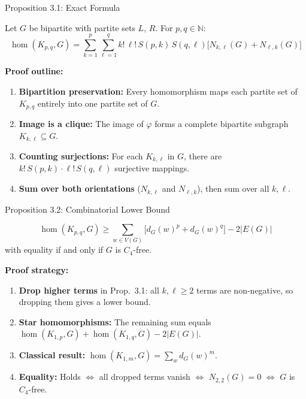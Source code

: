 \documentclass[10pt]{beamer}
\begin{document}
\begin{frame}{Proposition 3.1: Exact Formula}
  \begin{theorem}[Proposition 3.1]
    Let $G$ be bipartite with partite sets $L$, $R$. For $p, q \in \mathbb{N}$:
    \[
      \hom(K_{p,q}, G) = \sum_{k=1}^{p} \sum_{\ell=1}^{q} k!\, \ell!\, S(p,k)\, S(q,\ell)
      \bigl[N_{k,\ell}(G) + N_{\ell,k}(G)\bigr]
    \]
  \end{theorem}

  \textbf{Proof outline:}
  \begin{enumerate}
    \item \textbf{Bipartition preservation:} Every homomorphism maps each partite set of $K_{p,q}$ entirely into one partite set of $G$.
    \item \textbf{Image is a clique:} The image of $\varphi$ forms a complete bipartite subgraph $K_{k,\ell} \subseteq G$.
    \item \textbf{Counting surjections:} For each $K_{k,\ell}$ in $G$, there are $k!\,S(p,k) \cdot \ell!\,S(q,\ell)$ surjective mappings.
    \item \textbf{Sum over both orientations} ($N_{k,\ell}$ and $N_{\ell,k}$), then sum over all $k, \ell$.
  \end{enumerate}
\end{frame}

\begin{frame}{Proposition 3.2: Combinatorial Lower Bound}
  \begin{theorem}[Proposition 3.2]
    \[
      \hom(K_{p,q}, G) \geq \sum_{w \in V(G)} \bigl[d_G(w)^p + d_G(w)^q\bigr] - 2|E(G)|
    \]
    with equality if and only if $G$ is $C_4$-free.
  \end{theorem}

  \textbf{Proof strategy:}
  \begin{enumerate}
    \item \textbf{Drop higher terms} in Prop.\ 3.1: all $k, \ell \geq 2$ terms are non-negative, so dropping them gives a lower bound.
    \item \textbf{Star homomorphisms:} The remaining sum equals
      $\hom(K_{1,p}, G) + \hom(K_{1,q}, G) - 2|E(G)|$.
    \item \textbf{Classical result:} $\hom(K_{1,m}, G) = \sum_w d_G(w)^m$.
    \item \textbf{Equality:} Holds $\Leftrightarrow$ all dropped terms vanish $\Leftrightarrow$ $N_{2,2}(G) = 0$ $\Leftrightarrow$ $G$ is $C_4$-free.
  \end{enumerate}
\end{frame}
\end{document}
